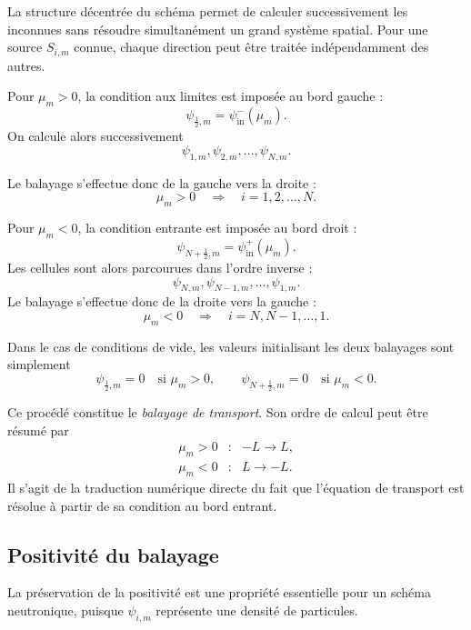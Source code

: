 \documentclass{article}
\begin{document}
La structure décentrée du schéma permet de calculer successivement les inconnues sans résoudre simultanément un grand système spatial. Pour une source $S_{i,m}$ connue, chaque direction peut être traitée indépendamment des autres.

Pour $\mu_m>0$, la condition aux limites est imposée au bord gauche :
\[
    \psi_{\frac12,m} = \psi_{\mathrm{in}}^{-}(\mu_m).
\]
On calcule alors successivement
\[
    \psi_{1,m}, \psi_{2,m}, \ldots, \psi_{N,m}.
\]

Le balayage s'effectue donc de la gauche vers la droite :
\begin{equation}
    \boxed{\mu_m>0 \quad \Longrightarrow  \quad  i=1,2,\ldots,N.}
\label{eq:balayage-positif}
\end{equation}

Pour $\mu_m<0$, la condition entrante est imposée au bord droit :
\[
    \psi_{N+\frac12,m} = \psi_{\mathrm{in}}^{+}(\mu_m).
\]
Les cellules sont alors parcourues dans l'ordre inverse :
\[
    \psi_{N,m}, \psi_{N-1,m}, \ldots, \psi_{1,m}.
\]
Le balayage s'effectue donc de la droite vers la gauche :
\begin{equation}
    \boxed{
        \mu_m<0 \quad \Longrightarrow \quad i=N,N-1,\ldots,1.}
    \label{eq:balayage-negatif}
\end{equation}

Dans le cas de conditions de vide, les valeurs initialisant les deux
balayages sont simplement
\[
    \psi_{\frac12,m}=0 \quad\text{si }\mu_m>0,
    \qquad
    \psi_{N+\frac12,m}=0 \quad\text{si }\mu_m<0.
\]

Ce procédé constitue le \emph{balayage de transport}. Son ordre de calcul peut être résumé par
\[
    \boxed{
    \begin{array}{ccl}
        \mu_m>0 &:& -L\longrightarrow L,\\[0.15cm]
        \mu_m<0 &:& L\longrightarrow -L.
    \end{array}
    }
\]
Il s'agit de la traduction numérique directe du fait que l'équation de transport est résolue à partir de sa condition au bord entrant.

\subsection {Positivité du balayage}

La préservation de la positivité est une propriété essentielle pour un schéma neutronique, puisque $\psi_{i,m}$ représente une densité de particules.
\end{document}
